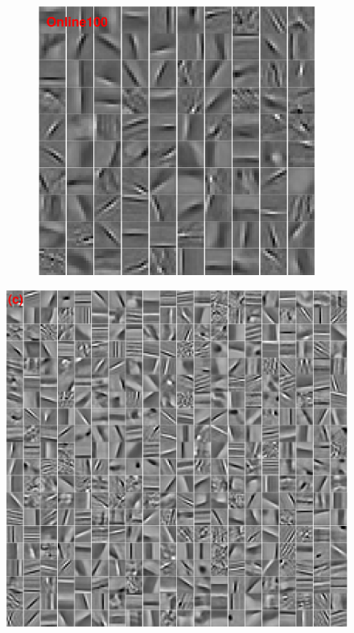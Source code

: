 \begin{figure}[h]
\begin{minipage}{0.4\textwidth}
\begin{subfigure}{1\textwidth}
    \centering
  \includegraphics[width=0.75\linewidth]{figure/online100-filter.pdf}
\end{subfigure}
\end{minipage}
\begin{minipage}{0.6\textwidth}
\centering
\includegraphics[width=0.97\linewidth]{figure/online400-filter.pdf}
\end{minipage}
    \\
    \\

\end{figure}
